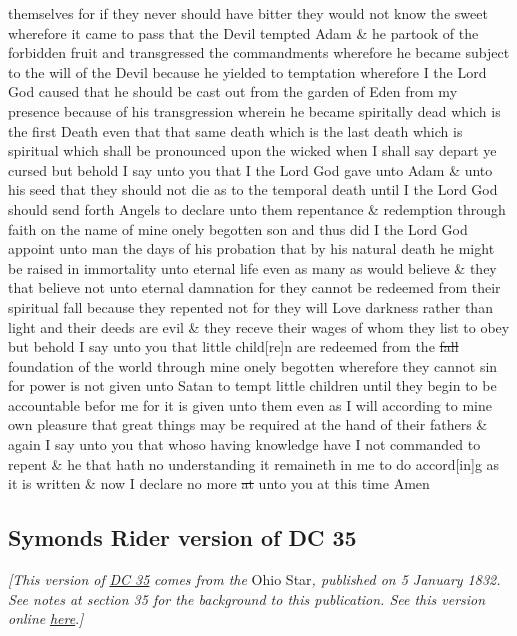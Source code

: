 themselves for if they never should have bitter they would not know the sweet wherefore it came to pass that the Devil tempted Adam \& he partook of the forbidden fruit and transgressed the commandments wherefore he became subject to the will of the Devil because he yielded to temptation wherefore I the Lord God caused that he should be cast out from the garden of Eden from my presence because of his transgression wherein he became spiritally dead which is the first Death even that that same death which is the last death which is spiritual which shall be pronounced upon the wicked when I shall say depart ye cursed but behold I say unto you that I the Lord God gave unto Adam \& unto his seed that they should not die as to the temporal death until I the Lord God should send forth Angels to declare unto them repentance \& redemption through faith on the name of mine onely begotten son and thus did I the Lord God appoint unto man the days of his probation that by his natural death he might be raised in immortality unto eternal life even as many as would believe \& they that believe not unto eternal damnation for they cannot be redeemed from their spiritual fall because they repented not for they will Love darkness rather than light and their deeds are evil \& they receve their wages of whom they list to obey but behold I say unto you that little child[re]n are redeemed from the \sout{fall} foundation of the world through mine onely begotten wherefore they cannot sin for power is not given unto Satan to tempt little children until they begin to be accountable befor me for it is given unto them even as I will according to mine own pleasure that great things may be required at the hand of their fathers \& again I say unto you that whoso having knowledge have I not commanded to repent \& he that hath no understanding it remaineth in me to do accord[in]g as it is written \& now I declare no more \sout{at} unto you at this time Amen
		
	\subsection{Symonds Rider version of DC 35}
		\label{EXSS-DC35-RIDER}
		
		\textit{[This version of} \hyperref[DC35]{\textit{DC 35}} \textit{comes from the} Ohio Star\textit{, published on 5 January 1832. See notes at section 35 for the background to this publication. See this version online} \href{https://www.josephsmithpapers.org/paper-summary/revelation-7-december-1830-as-published-in-ohio-star-dc-35/1}{\textit{here}}.\textit{]}
		
